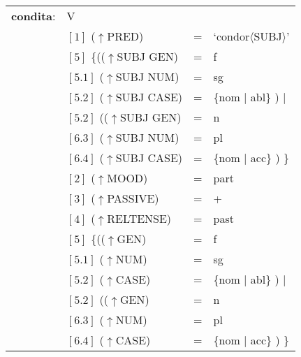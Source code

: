 \documentclass[12pt,a4paper]{article}
\begin{document}
\begin{singlespace}
\begin{tabular}{ l  l  l  l  } 
\textbf{condita}: & V \\
$\qquad$ & $[1]$ \:  ($\uparrow$PRED) & = & `condor$\langle$SUBJ$\rangle$'\\
$\qquad$ & $[5]$ \:  \{(($\uparrow$SUBJ GEN) & = & f \\ 
$\qquad$ & $[5.1]$ \:  ($\uparrow$SUBJ NUM) & = & sg \\
$\qquad$ & $[5.2]$ \:  ($\uparrow$SUBJ CASE) & = & \{nom $\mid$ abl\} ) $\mid$\\
$\qquad$ & $[5.2]$ \: (($\uparrow$SUBJ GEN) & = & n \\
$\qquad$ & $[6.3]$ \:  ($\uparrow$SUBJ NUM) & = & pl \\
$\qquad$ & $[6.4]$ \:  ($\uparrow$SUBJ CASE) & = & \{nom $\mid$ acc\} ) \}\\
$\qquad$ & $[2]$ \:  ($\uparrow$MOOD) & = & part\\
$\qquad$ & $[3]$ \:  ($\uparrow$PASSIVE) & = & + \\
$\qquad$ & $[4]$ \:  ($\uparrow$RELTENSE) & = & past \\
$\qquad$ & $[5]$ \:  \{(($\uparrow$GEN) & = & f \\ 
$\qquad$ & $[5.1]$ \:  ($\uparrow$NUM) & = & sg \\
$\qquad$ & $[5.2]$ \:  ($\uparrow$CASE) & = & \{nom $\mid$ abl\} ) $\mid$\\
$\qquad$ & $[5.2]$ \: (($\uparrow$GEN) & = & n \\
$\qquad$ & $[6.3]$ \:  ($\uparrow$NUM) & = & pl \\
$\qquad$ & $[6.4]$ \:  ($\uparrow$CASE) & = & \{nom $\mid$ acc\} ) \}\\
\end{tabular}
\newline
\newline
\end{singlespace}
\end{document}
